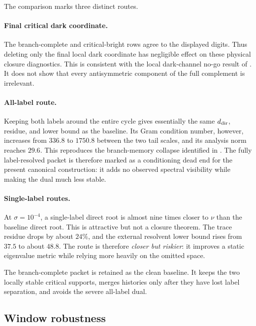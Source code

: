 \documentclass[11pt]{article}
\theoremstyle{definition}
\theoremstyle{remark}
\begin{document}
The comparison marks three distinct routes.

\paragraph{Final critical dark coordinate.}
The branch-complete and critical-bright rows agree to the displayed digits.
Thus deleting only the final local dark coordinate has negligible effect on
these physical closure diagnostics.  This is consistent with the local
dark-channel no-go result of \citep{WangDarkSchur2026}.  It does not show
that every antisymmetric component of the full complement is irrelevant.

\paragraph{All-label route.}
Keeping both labels around the entire cycle gives essentially the same
$d_{\rm dir}$, residue, and lower bound as the baseline.  Its Gram condition
number, however, increases from $336.8$ to $1750.8$ between the two tail
scales, and its analysis norm reaches $29.6$.  This reproduces the
branch-memory collapse identified in \citep{WangBiorthogonal2026}.  The
fully label-resolved packet is therefore marked as a conditioning dead end
for the present canonical construction: it adds no observed spectral
visibility while making the dual much less stable.

\paragraph{Single-label routes.}
At $\sigma=10^{-4}$, a single-label direct root is almost nine times closer
to $\nu$ than the baseline direct root.  This is attractive but not a
closure theorem.  The trace residue drops by about $24\%$, and the external
resolvent lower bound rises from $37.5$ to about $48.8$.  The route is
therefore \emph{closer but riskier}: it improves a static eigenvalue metric
while relying more heavily on the omitted space.

The branch-complete packet is retained as the clean baseline.  It keeps the
two locally stable critical supports, merges histories only after they have
lost label separation, and avoids the severe all-label dual.

\subsection{Window robustness}
\end{document}
